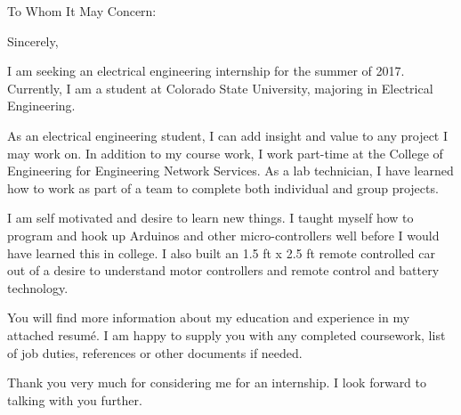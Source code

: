 \documentclass[10pt,letterpaper,sans]{moderncv}
\begin{document}



\clearpage
{}
\date{\today}
\opening{To Whom It May Concern:}
\closing{Sincerely,}
\makelettertitle{}

I am seeking an electrical engineering internship for the summer of 2017.
Currently, I am a student at Colorado State University, majoring in Electrical
Engineering.

As an electrical engineering student, I can add insight and value to any project
I may work on. In addition to my course work, I work part-time at the College
of Engineering for Engineering Network Services. As a lab technician, I have
learned how to work as part of a team to complete both individual and group
projects.

I am self motivated and desire to learn new things. I taught myself how to
program and hook up Arduinos and other micro-controllers well before I would
have learned this in college. I also built an 1.5 ft x 2.5 ft remote controlled
car out of a desire to understand motor controllers and remote control and
battery technology.

You will find more information about my education and experience in my attached
resumé. I am happy to supply you with any completed coursework, list of job
duties, references or other documents if needed.

Thank you very much for considering me for an internship. I look forward to
talking with you further.

\makeletterclosing{}
\end{document}
